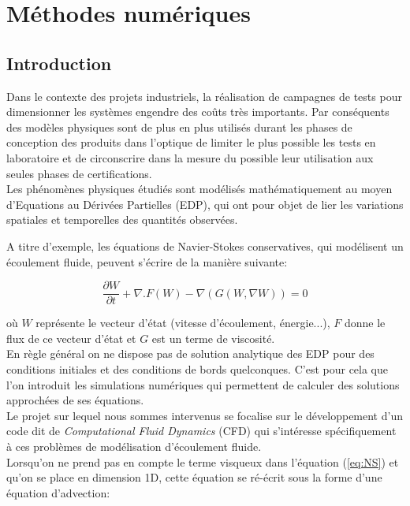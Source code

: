 \section{Méthodes numériques}
\subsection{Introduction}
Dans le contexte des projets industriels, la réalisation de campagnes de tests pour dimensionner les systèmes engendre des coûts très importants. Par conséquents des modèles physiques sont de plus en plus utilisés durant les phases de conception des produits dans l'optique de limiter le plus possible les tests en laboratoire et de circonscrire dans la mesure du possible leur utilisation aux seules phases de certifications.\\

Les phénomènes physiques étudiés sont modélisés mathématiquement au moyen d'Equations au Dérivées Partielles (EDP), qui ont pour objet de lier les variations spatiales et temporelles des quantités observées.

A titre d'exemple, les équations de Navier-Stokes conservatives, qui modélisent un écoulement fluide, peuvent s'écrire de la manière suivante:

\begin{equation}
    \frac{\partial W}{\partial t} + \nabla . F(W) -\nabla\left( G(W,\nabla W)\right)=0
    \label{eq:NS}
\end{equation}

où $W$ représente le vecteur d'état (vitesse d'écoulement, énergie...), $F$ donne le flux de ce vecteur d'état et $G$ est un terme de viscosité.\\

En règle général on ne dispose pas de solution analytique des EDP pour des conditions initiales et des conditions de bords quelconques. C'est pour cela que l'on introduit les simulations numériques qui permettent de calculer des solutions approchées de ses équations.\\

Le projet sur lequel nous sommes intervenus se focalise sur le développement d'un code dit de \emph{Computational Fluid Dynamics} (CFD) qui s'intéresse spécifiquement à ces problèmes de modélisation d'écoulement fluide.\\

Lorsqu'on ne prend pas en compte le terme visqueux dans l'équation (\ref{eq:NS}) et qu'on se place en dimension 1D, cette équation se ré-écrit sous la forme d'une équation d'advection:


